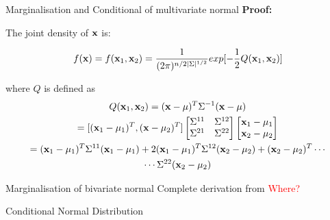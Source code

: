 \documentclass{beamer}
\begin{document}
\begin{frame}{Marginalisation and Conditional of multivariate normal}
	\textbf{Proof:}
	
	The joint density of ${\bf x}$ is:
	
	\begin{equation}
	f({\bf x})=f({\bf x}_1,{\bf x}_2)=\frac{1}{(2\pi)^{n/2\vert\Sigma\vert^{1/2}}}exp[-\frac{1}{2}Q({\bf x}_1,{\bf x}_2)] 
	\end{equation}
	
	where $Q$ is defined as
	\begin{gather}
		Q({\bf x}_1,{\bf x}_2) = ({\bf x}-\mu)^T\Sigma^{-1}({\bf x}-\mu)\\
		= [({\bf x}_1-\mu_1)^T, ({\bf x}-\mu_2)^T] 
		\begin{bmatrix}
			\Sigma^{11} & \Sigma^{12}\\
			\Sigma^{21} & \Sigma^{22}
		\end{bmatrix}
		\begin{bmatrix}
			{\bf x}_1-\mu_1 \\
			{\bf x}_2-\mu_2
		\end{bmatrix}\\
		= ({\bf x}_1-\mu_1)^T\Sigma^{11}({\bf x}_1-\mu_1)+ 2({\bf x}_1-\mu_1)^T\Sigma^{12}({\bf x}_2-\mu_2) + ({\bf x}_2-\mu_2)^T \cdots \\
		\cdots \Sigma^{22}({\bf x}_2-\mu_2)
	\end{gather}
\end{frame}

\begin{frame}{Marginalisation of bivariate normal}
	Complete derivation from \textcolor{red}{Where?}
\end{frame}

\begin{frame}{Conditional Normal Distribution}

\end{frame}
\end{document}
